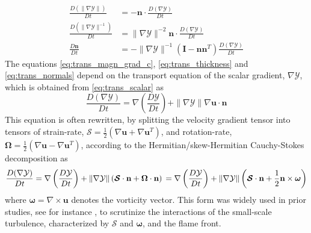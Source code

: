 \begin{align}
\frac{D(\|\nabla \mathcal{Y}\|)}{Dt} &= - \mathbf{n} \cdot \frac{D(\nabla \mathcal{Y})}{Dt}
\label{eq:trans_magn_grad_c}\\
%
\frac{D(\|\nabla \mathcal{Y}\|^{-1})}{Dt} &= \|\nabla \mathcal{Y}\|^{-2 }\mathbf{n} \cdot 
\frac{D(\nabla \mathcal{Y})}{Dt}
\label{eq:trans_thickness}\\
%
\frac{D\mathbf{n}}{Dt} &= - \|\nabla \mathcal{Y}\|^{-1} (\mathcal{\boldsymbol{I}} - \mathbf{n}\mathbf{n}^T) \frac{D(\nabla \mathcal{Y})}{Dt}
\label{eq:trans_normals}
\end{align}
%
The equations \eqref{eq:trans_magn_grad_c}, \eqref{eq:trans_thickness} and  \eqref{eq:trans_normals}
depend on the transport equation of the scalar gradient, $\nabla \mathcal{Y}$, which is obtained
from \eqref{eq:trans_scalar} as 
%
\begin{equation}
\frac{D(\nabla \mathcal{Y})}{Dt} = \nabla \left( \frac{D\mathcal{Y}}{Dt}\right) + 
\|\nabla \mathcal{Y}\| \nabla \mathbf{u} \cdot\mathbf{n}
\label{eq:trans_scalar_grad_form0}
\end{equation}
%
This equation is often rewritten, by splitting the velocity gradient tensor into tensors of strain-rate, 
$\boldsymbol{\mathcal{S}}  = \frac{1}{2}\left(\nabla \mathbf{u} + \nabla \mathbf{u}^{T}\right)$, and rotation-rate, $\boldsymbol{\Omega}  = \frac{1}{2}\left(\nabla \mathbf{u} - \nabla \mathbf{u}^{T}\right)$, according to the Hermitian/skew-Hermitian Cauchy-Stokes decomposition as
%
\begin{dmath}
\frac{D(\nabla \mathcal{Y})}{Dt} = \nabla \left( \frac{D\mathcal{Y}}{Dt}\right) +
                   \|\nabla \mathcal{Y}\| \left(
                        \boldsymbol{\mathcal{S}} \cdot \mathbf{n} + 
                        \boldsymbol{\Omega} \cdot \mathbf{n}
                        \right) \\
       = \nabla \left( \frac{D\mathcal{Y}}{Dt}\right) +
        \|\nabla \mathcal{Y}\| \left(
        \boldsymbol{\mathcal{S}} \cdot \mathbf{n}
        +\frac{1}{2} \mathbf{n} \times \boldsymbol{\omega}
        \right)
\label{eq:cauchy_stokes}
\end{dmath}
%
where $\boldsymbol{\omega} = \nabla \times \mathbf{u}$ denotes the vorticity vector.
%
This form was widely used in prior studies, see for instance \cite{hamlington2011interactions,wacks2016flow,zhao2018dynamics}, to scrutinize the interactions of the small-scale turbulence, characterized by $\boldsymbol{\mathcal{S}}$ and $\boldsymbol{\omega}$, and the flame front.
